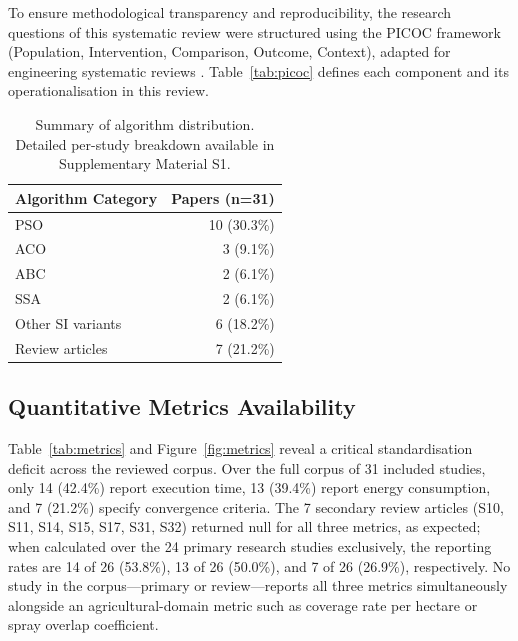 \documentclass[review,3p,times]{elsarticle}
\begin{document}
\begin{itemize}
{To ensure methodological transparency and reproducibility, the research questions of this systematic review were structured using the PICOC framework (Population, Intervention, Comparison, Outcome, Context), adapted for engineering systematic reviews \cite{brambilla2013,bayindir2016}. Table~\ref{tab:picoc} defines each component and its operationalisation in this review.


\begin{table}[htbp]
\centering
\caption{Algorithm distribution across the 33 reviewed studies. For detailed per-algorithm breakdown, see Supplementary Material S1.}
\begin{tabular}{lr}
\toprule
\textbf{Algorithm Category} & \textbf{Papers (n=31)} \\
\midrule
PSO & 10 (30.3\%) \\
ACO & 3 (9.1\%) \\
ABC & 2 (6.1\%) \\
SSA & 2 (6.1\%) \\
Other SI variants & 6 (18.2\%) \\
Review articles & 7 (21.2\%) \\
\bottomrule
\end{tabular}
\caption{Summary of algorithm distribution. Detailed per-study breakdown available in Supplementary Material S1.}
\end{table}


\subsection{Quantitative Metrics Availability}

Table~\ref{tab:metrics} and Figure~\ref{fig:metrics} reveal a critical standardisation deficit across the reviewed corpus. Over the full corpus of 31 included studies, only 14 (42.4\%) report execution time, 13 (39.4\%) report energy consumption, and 7 (21.2\%) specify convergence criteria. The 7 secondary review articles (S10, S11, S14, S15, S17, S31, S32) returned null for all three metrics, as expected; when calculated over the 24 primary research studies exclusively, the reporting rates are 14 of 26 (53.8\%), 13 of 26 (50.0\%), and 7 of 26 (26.9\%), respectively. No study in the corpus---primary or review---reports all three metrics simultaneously alongside an agricultural-domain metric such as coverage rate per hectare or spray overlap coefficient.

}
\end{itemize}
\end{document}
